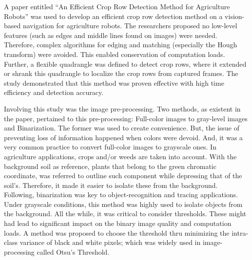     A paper entitled “An Efficient Crop Row Detection Method for Agriculture Robots” was used to develop an efficient crop row detection method on a vision-based navigation for agriculture robots. The researchers proposed no low-level features (such as edges and middle lines found on images) were needed. Therefore, complex algorithms for edging and matching (especially the Hough transform) were avoided. This enabled conservation of computation loads. Further, a flexible quadrangle was defined to detect crop rows, where it extended or shrank this quadrangle to localize the crop rows from captured frames. The study demonstrated that this method was proven effective with high time efficiency and detection accuracy.
 
    Involving this study was the image pre-processing. Two methods, as existent in the paper, pertained to this pre-processing: Full-color images to gray-level images and Binarization. The former was used to create convenience. But, the issue of preventing loss of information happened when colors were devoid. And, it was a very common practice to convert full-color images to grayscale ones. In agriculture applications, crops and/or weeds are taken into account. With the background soil as reference, plants that belong to the green chromatic coordinate, was referred to outline such component while depressing that of the soil’s. Therefore, it made it easier to isolate these from the background. Following, binarization was key to object-recognition and tracing applications. Under grayscale conditions, this method was highly used to isolate objects from the background. All the while, it was critical to consider thresholds. These might had lead to significant impact on the binary image quality and computation loads. A method was proposed to choose the threshold thru minimizing the intra-class variance of black and white pixels; which was widely used in image-processing called Otsu’s Threshold.
 
